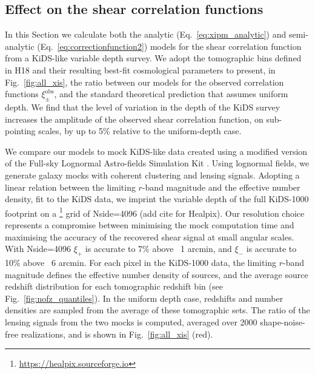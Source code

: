 \documentclass{aa}
\renewcommand{\rm}{\mathrm}
\begin{document}
\subsection{Effect on the shear correlation functions}

In this Section we calculate both the analytic (Eq.~\ref{eq:xipm_analytic}) and semi-analytic (Eq.~\ref{eq:correctionfunction2}) models for the shear correlation function from a KiDS-like variable depth survey.   We adopt the tomographic bins defined in H18 and their resulting best-fit cosmological parameters to present, in Fig.~\ref{fig:all_xis}, the ratio between our models for the observed correlation functions $\xi_\pm^{\rm{obs}}$, and the standard theoretical prediction that assumes uniform depth. We find that the level of variation in the depth of the KiDS survey increases the amplitude of the observed shear correlation function, on sub-pointing scales, by up to 5\% relative to the uniform-depth case.

We compare our models to mock KiDS-like data created using a modified version of the Full-sky Lognormal Astro-fields Simulation Kit \citep[,][Joachimi, Lin, et al. in prep.]{Xavier:2016}.  Using {} lognormal fields, we generate galaxy mocks with coherent clustering and lensing signals.   Adopting a linear relation between the limiting $r$-band magnitude and the effective number density, fit to the KiDS data, we imprint the variable depth of the full KiDS-1000 footprint \citep{Kuijken:2019} on a {}\footnote{\url{https://healpix.sourceforge.io}} grid of Nside=4096 (add cite for Healpix).  Our resolution choice represents a compromise between minimising the mock computation time and maximising the accuracy of the recovered shear signal at small angular scales.  With Nside=4096 $\xi_+$ is accurate to 7\% above ~1 arcmin, and $\xi_-$ is accurate to 10\% above ~6 arcmin.   For each {} pixel in the KiDS-1000 data, the limiting $r$-band magnitude defines the effective number density of sources, and the average source redshift distribution for each tomographic redshift bin (see Fig.~\ref{fig:nofz_quantiles}).  In the uniform depth case, redshifts and number densities are sampled from the average of these tomographic sets.  The ratio of the lensing signals from the two mocks is computed, averaged over 2000 shape-noise-free realizations, and is shown in Fig.~\ref{fig:all_xis} (red).
\end{document}
